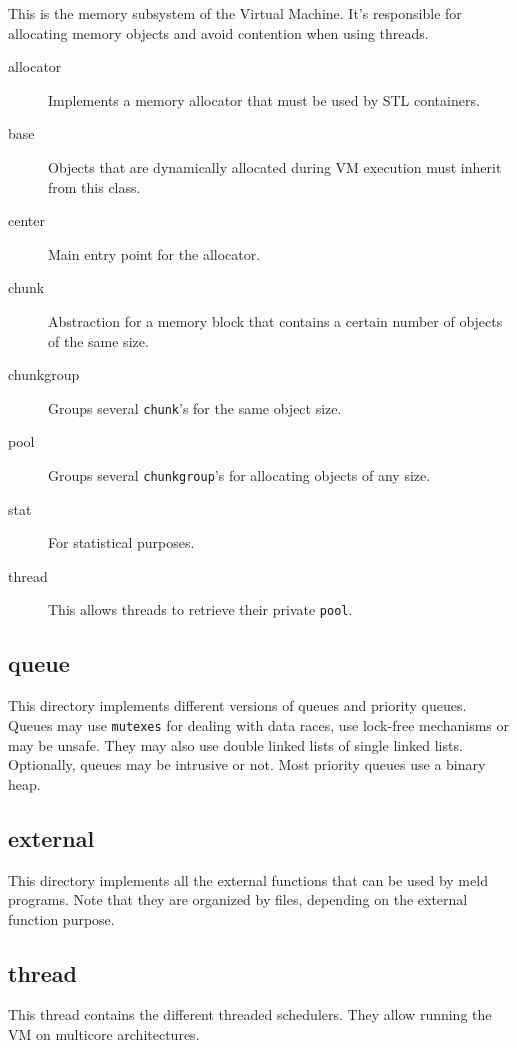 \documentclass[11pt]{article}
\begin{document}
This is the memory subsystem of the Virtual Machine. It's responsible for allocating memory objects and avoid contention when using threads.

\begin{description}
   \item[allocator] Implements a memory allocator that must be used by STL containers.
   \item[base] Objects that are dynamically allocated during VM execution must inherit from this class.
   \item[center] Main entry point for the allocator.
   \item[chunk] Abstraction for a memory block that contains a certain number of objects of the same size.
   \item[chunkgroup] Groups several \texttt{chunk}'s for the same object size.
   \item[pool] Groups several \texttt{chunkgroup}'s for allocating objects of any size.
   \item[stat] For statistical purposes.
   \item[thread] This allows threads to retrieve their private \texttt{pool}.
\end{description}

\subsection{queue}

This directory implements different versions of queues and priority queues. Queues may use \texttt{mutexes} for dealing with data races, use lock-free mechanisms or may be unsafe. They may also use double linked lists of single linked lists. Optionally, queues may be intrusive or not. Most priority queues use a binary heap.

\subsection{external}

This directory implements all the external functions that can be used by meld programs. Note that they are organized by files, depending on the external function purpose.

\subsection{thread}

This thread contains the different threaded schedulers. They allow running the VM on multicore architectures.
\end{document}
